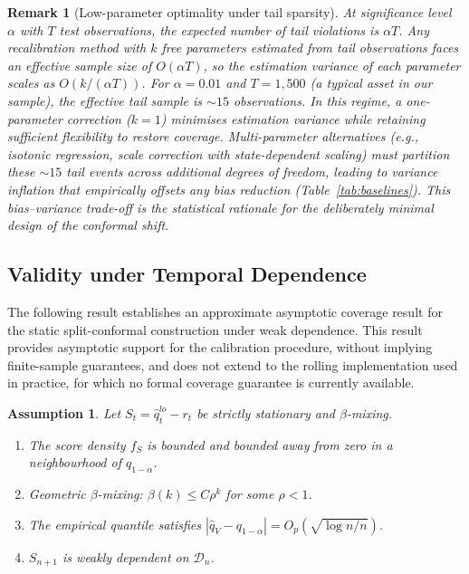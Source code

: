 \documentclass[preprint,11pt,authoryear]{elsarticle}
\newtheorem{remark}[theorem]{Remark}
\newtheorem{assumption}[theorem]{Assumption}
\newcommand{\1}{\boldsymbol{1}}
\begin{document}
	\begin{remark}[Low-parameter optimality under tail sparsity]
		\label{rem:tail_sparsity}
		At significance level $\alpha$ with $T$ test observations, the expected number of tail violations is $\alpha T$. Any recalibration method with $k$ free parameters estimated from tail observations faces an effective sample size of $O(\alpha T)$, so the estimation variance of each parameter scales as $O(k / (\alpha T))$. For $\alpha = 0.01$ and $T = 1{,}500$ (a typical asset in our sample), the effective tail sample is ${\sim}15$ observations. In this regime, a one-parameter correction ($k = 1$) minimises estimation variance while retaining sufficient flexibility to restore coverage. Multi-parameter alternatives (e.g., isotonic regression, scale correction with state-dependent scaling) must partition these ${\sim}15$ tail events across additional degrees of freedom, leading to variance inflation that empirically offsets any bias reduction (Table~\ref{tab:baselines}). This bias--variance trade-off is the statistical rationale for the deliberately minimal design of the conformal shift.
	\end{remark}

	\subsection{Validity under Temporal Dependence}
	\label{sec:validity}
	
	The following result establishes an approximate asymptotic coverage result for the static split-conformal construction under
	weak dependence. This result provides asymptotic support for the calibration procedure, without implying finite-sample guarantees, and does not extend to the rolling implementation used in practice, for which no formal coverage guarantee is currently available.

	\begin{assumption}\label{ass:main}
		Let $S_t = \hat{q}^{lo}_t - r_t$ be strictly stationary and $\beta$-mixing.
		\begin{enumerate}[label=\textup{(A\arabic*)}]
			\item\label{ass:density} The score density $f_S$ is bounded and bounded away from zero in a neighbourhood of $q_{1-\alpha}$.
			\item\label{ass:mixing} Geometric $\beta$-mixing: $\beta(k) \leq C\rho^k$ for some $\rho < 1$.
			\item\label{ass:quantile} The empirical quantile satisfies $|\hat{q}_V - q_{1-\alpha}| = O_p(\sqrt{\log n / n})$.
			\item\label{ass:weak_dep} $S_{n+1}$ is weakly dependent on $\mathcal{D}_n$.
		\end{enumerate}
	\end{assumption}
\end{document}
